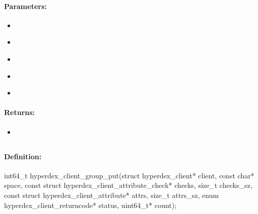 \paragraph{Parameters:}
\begin{itemize}[noitemsep]
\item {}\\

\item {}\\

\item {}\\

\item {}\\

\item {}\\

\end{itemize}

\paragraph{Returns:}
\begin{itemize}[noitemsep]
\item {}\\

\end{itemize}

\pagebreak
\subsection{}
\label{api:c:group_put}


\paragraph{Definition:}
\begin{ccode}
int64_t hyperdex_client_group_put(struct hyperdex_client* client,
        const char* space,
        const struct hyperdex_client_attribute_check* checks, size_t checks_sz,
        const struct hyperdex_client_attribute* attrs, size_t attrs_sz,
        enum hyperdex_client_returncode* status,
        uint64_t* count);
\end{ccode}

